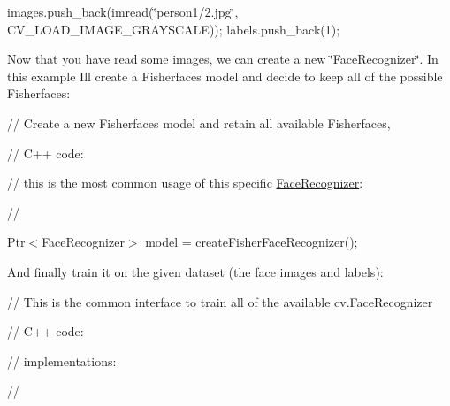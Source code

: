 {\ttfamily }

{\ttfamily }

{\ttfamily images.\+push\+\_\+back(imread(\char`\"{}person1/2.\+jpg\char`\"{}, C\+V\+\_\+\+L\+O\+A\+D\+\_\+\+I\+M\+A\+G\+E\+\_\+\+G\+R\+A\+Y\+S\+C\+A\+LE)); labels.\+push\+\_\+back(1);}

{\ttfamily }

{\ttfamily }

{\ttfamily Now that you have read some images, we can create a new \char`\"{}\+Face\+Recognizer\char`\"{}. In this example I\textquotesingle{}ll create a Fisherfaces model and decide to keep all of the possible Fisherfaces\+: }

// Create a new Fisherfaces model and retain all available Fisherfaces, {\ttfamily }

{\ttfamily }

{\ttfamily }

{\ttfamily // C++ code\+:}

{\ttfamily }

{\ttfamily }

{\ttfamily // this is the most common usage of this specific \mbox{\hyperlink{classorg_1_1opencv_1_1contrib_1_1_face_recognizer}{Face\+Recognizer}}\+:}

{\ttfamily }

{\ttfamily }

{\ttfamily //}

{\ttfamily }

{\ttfamily }

{\ttfamily Ptr$<$\+Face\+Recognizer$>$ model = create\+Fisher\+Face\+Recognizer();}

{\ttfamily }

{\ttfamily }

{\ttfamily And finally train it on the given dataset (the face images and labels)\+: }

// This is the common interface to train all of the available cv.\+Face\+Recognizer {\ttfamily }

{\ttfamily }

{\ttfamily }

{\ttfamily // C++ code\+:}

{\ttfamily }

{\ttfamily }

{\ttfamily // implementations\+:}

{\ttfamily }

{\ttfamily }

{\ttfamily //}

